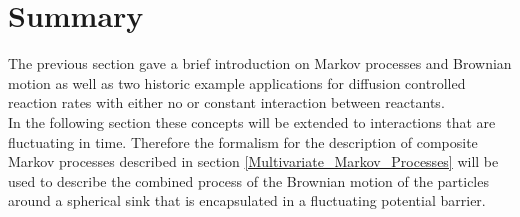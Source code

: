 \section{Summary}
The previous section gave a brief introduction on Markov processes and Brownian motion as well as two historic example applications for diffusion controlled reaction rates with either no or constant interaction between reactants. \\
In the following section these concepts will be extended to interactions that are fluctuating in time. Therefore the formalism for the description of composite Markov processes described in section \ref{Multivariate_Markov_Processes} will be used to describe the combined process of the Brownian motion of the particles around a spherical sink that is encapsulated in a fluctuating potential barrier.

\newpage

